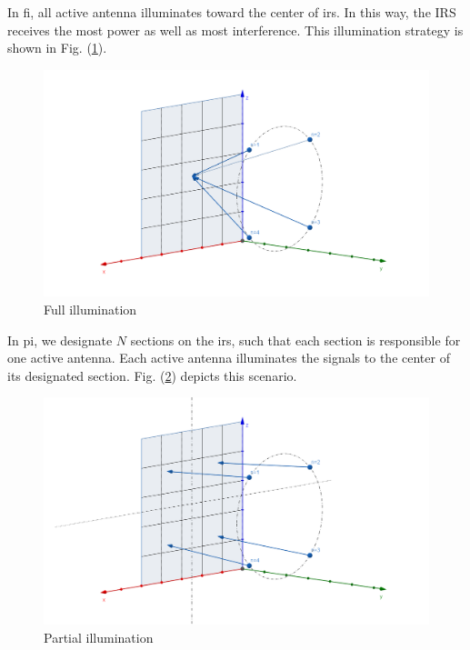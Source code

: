 \documentclass[12pt,draftclsnofoot,onecolumn,journal]{IEEEtran}
\begin{document}
In \ac{fi}, all active antenna illuminates toward the center of \ac{irs}. In this way, the IRS receives the most power as well as most interference. This illumination strategy is shown in Fig. (\ref{fig:fi}).
\begin{figure}[htbp]
\includegraphics[width=6in]{fullillumination.png} 
\caption{Full illumination} \label{fig:fi}
\end{figure}

In \ac{pi}, we designate $N$ sections on the \ac{irs}, such that each section is responsible for one active antenna. Each active antenna illuminates the signals to the center of its designated section. Fig. (\ref{fig:pi}) depicts this scenario.
\begin{figure}[htbp]
\includegraphics[width=6in]{partialillumination.png} 
\caption{Partial illumination} \label{fig:pi}
\end{figure}
\end{document}
